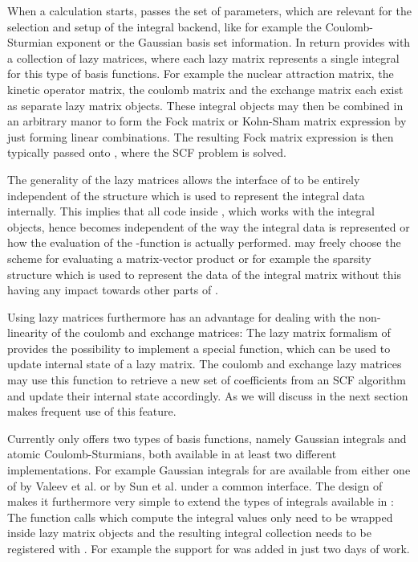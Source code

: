 When a calculation starts,
\molsturm passes \gint the set of parameters,
which are relevant for the selection and setup of the integral backend,
like for example the Coulomb-Sturmian exponent or the Gaussian basis set information.
In return \gint provides \molsturm with a collection of lazy matrices,
where each lazy matrix represents a single integral for this
type of basis functions.
For example the nuclear attraction matrix, the kinetic operator matrix,
the coulomb matrix and the exchange matrix each exist as separate
lazy matrix objects.
These integral objects may then be combined
in an arbitrary manor to form the Fock matrix or Kohn-Sham matrix
expression by just forming linear combinations.
The resulting Fock matrix expression is then typically passed onto \gscf,
where the SCF problem is solved.

The generality of the lazy matrices allows the interface of \gint
to be entirely independent of the structure
which is used to represent the integral data internally.
This implies that all code inside \molsturm,
which works with the integral objects,
hence becomes independent of the way the integral data is represented
or how the evaluation of the \contraction-function is actually performed.
\gint may freely choose the scheme for evaluating a matrix-vector
product or for example the sparsity structure which is used to
represent the data of the integral matrix
without this having any impact towards other parts of \molsturm.

Using lazy matrices furthermore has an advantage for
dealing with the non-linearity of the coulomb and exchange matrices:
The lazy matrix formalism of \lazyten provides the possibility
to implement a special \update function,
which can be used to update internal state of a lazy matrix.
The coulomb and exchange lazy matrices
may use this function to retrieve a new set of coefficients from an
SCF algorithm and update
their internal state accordingly.
As we will discuss in the next section \gscf makes frequent use of this feature.

Currently \gint only offers two types of basis functions,
namely Gaussian integrals and atomic Coulomb-Sturmians,
both available in at least two different implementations.
For example Gaussian integrals for \gint are available from either one of 
\libint by Valeev et al.\cite{Libint2,Libint2_231}
or \libcint by Sun et al. 
under a common interface.
The design of \gint makes it furthermore very simple to extend the types of integrals
available in \molsturm:
The function calls which compute the integral values only need to be wrapped
inside lazy matrix objects and the resulting integral collection needs to be registered
with \gint.
For example the support for \libcint was added in just two days of work.

